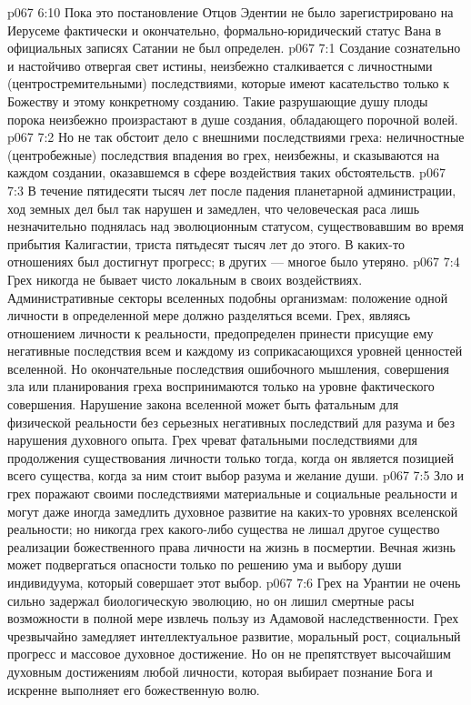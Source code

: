 \vs p067 6:10 Пока это постановление Отцов Эдентии не было зарегистрировано на Иерусеме фактически и окончательно, формально\hyp{}юридический статус Вана в официальных записях Сатании не был определен.
\vs p067 7:1 Создание сознательно и настойчиво отвергая свет истины, неизбежно сталкивается с личностными (центростремительными) последствиями, которые имеют касательство только к Божеству и этому конкретному созданию. Такие разрушающие душу плоды порока неизбежно произрастают в душе создания, обладающего порочной волей.
\vs p067 7:2 Но не так обстоит дело с внешними последствиями греха: неличностные (центробежные) последствия впадения во грех, неизбежны, и сказываются на каждом создании, оказавшемся в сфере воздействия таких обстоятельств.
\vs p067 7:3 В течение пятидесяти тысяч лет после падения планетарной администрации, ход земных дел был так нарушен и замедлен, что человеческая раса лишь незначительно поднялась над эволюционным статусом, существовавшим во время прибытия Калигастии, триста пятьдесят тысяч лет до этого. В каких\hyp{}то отношениях был достигнут прогресс; в других --- многое было утеряно.
\vs p067 7:4 Грех никогда не бывает чисто локальным в своих воздействиях. Административные секторы вселенных подобны организмам: положение одной личности в определенной мере должно разделяться всеми. Грех, являясь отношением личности к реальности, предопределен принести присущие ему негативные последствия всем и каждому из соприкасающихся уровней ценностей вселенной. Но окончательные последствия ошибочного мышления, совершения зла или планирования греха воспринимаются только на уровне фактического совершения. Нарушение закона вселенной может быть фатальным для физической реальности без серьезных негативных последствий для разума и без нарушения духовного опыта. Грех чреват фатальными последствиями для продолжения существования личности только тогда, когда он является позицией всего существа, когда за ним стоит выбор разума и желание души.
\vs p067 7:5 Зло и грех поражают своими последствиями материальные и социальные реальности и могут даже иногда замедлить духовное развитие на каких\hyp{}то уровнях вселенской реальности; но никогда грех какого\hyp{}либо существа не лишал другое существо реализации божественного права личности на жизнь в посмертии. Вечная жизнь может подвергаться опасности только по решению ума и выбору души индивидуума, который совершает этот выбор.
\vs p067 7:6 Грех на Урантии не очень сильно задержал биологическую эволюцию, но он лишил смертные расы возможности в полной мере извлечь пользу из Адамовой наследственности. Грех чрезвычайно замедляет интеллектуальное развитие, моральный рост, социальный прогресс и массовое духовное достижение. Но он не препятствует высочайшим духовным достижениям любой личности, которая выбирает познание Бога и искренне выполняет его божественную волю.
